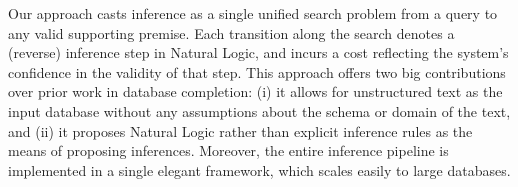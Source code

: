 
Our approach casts inference as a single unified search problem from 
  a query to any valid supporting premise.
Each transition along the search denotes a (reverse) inference step 
  in Natural Logic, and incurs a cost reflecting the system's confidence
  in the validity of that step.
This approach offers two big contributions over prior work in
  database completion:
  (i) it allows for unstructured text as the input database without
    any assumptions about the schema or domain of the text,
  and (ii) it proposes Natural Logic rather than explicit
    inference rules as the means of proposing inferences.
Moreover, the entire inference pipeline is implemented 
  in a single elegant framework, which scales easily to large
  databases.

%
%

